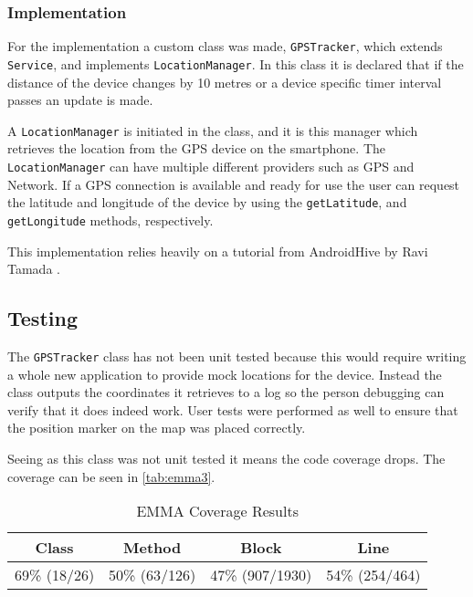 \subsubsection{Implementation}
For the implementation a custom class was made, \texttt{GPSTracker}, which extends \texttt{Service}, and implements \texttt{LocationManager}.
In this class it is declared that if the distance of the device changes by 10 metres or a device specific timer interval passes an update is made.

A \texttt{LocationManager} is initiated in the class, and it is this manager which retrieves the location from the \ac{GPS} device on the smartphone. The \texttt{LocationManager} can have multiple different providers such as \ac{GPS} and Network.
If a \ac{GPS} connection is available and ready for use the user can request the latitude and longitude of the device by using the \texttt{getLatitude}, and \texttt{getLongitude} methods, respectively.

This implementation relies heavily on a tutorial from AndroidHive by Ravi Tamada \citep{androidhive}.

\subsection{Testing}
The \texttt{GPSTracker} class has not been unit tested because this would require writing a whole new application to provide mock locations for the device. Instead the class outputs the coordinates it retrieves to a log so the person debugging can verify that it does indeed work. User tests were performed as well to ensure that the position marker on the map was placed correctly.

Seeing as this class was not unit tested it means the code coverage drops. The coverage can be seen in \autoref{tab:emma3}.

\begin{table}[!ht]
	\centering
	\begin{tabular}{| c | c | c | c |}
		\hline
		\textbf{Class} & \textbf{Method} & \textbf{Block} & \textbf{Line} \\ \hline
		69\% (18/26) & 50\% (63/126) & 47\% (907/1930) & 54\% (254/464) \\
		\hline
	\end{tabular}
	\caption{EMMA Coverage Results}
	\label{tab:emma3}
\end{table}
